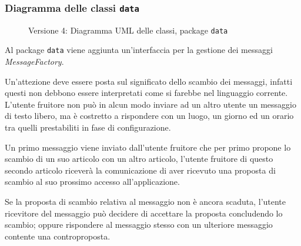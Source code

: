 \subsubsection{Diagramma delle classi \texttt{data}}
\vspace{0.5cm}
\begin{figure}[H]
    \centering
    \caption{Versione 4: Diagramma UML delle classi, package \texttt{data}}
    \label{fig:class_data_v_4}
\end{figure}

Al package \texttt{data} viene aggiunta un'interfaccia per la gestione dei messaggi \textit{MessageFactory}.

Un'attezione deve essere posta sul significato dello scambio dei messaggi, infatti questi non debbono essere interpretati come si farebbe
nel linguaggio corrente. L'utente fruitore non può in alcun modo inviare ad un altro utente un messaggio di testo libero, ma è costretto
a rispondere con un luogo, un giorno ed un orario tra quelli prestabiliti in fase di configurazione.

Un primo messaggio viene inviato dall'utente fruitore che per primo propone lo scambio di un suo articolo con un altro articolo,
l'utente fruitore di questo secondo articolo riceverà la comunicazione di aver ricevuto una proposta di scambio al suo prossimo accesso all'applicazione.

Se la proposta di scambio relativa al messaggio non è ancora scaduta, l'utente ricevitore del messaggio può decidere di accettare la proposta concludendo lo scambio;
oppure rispondere al messaggio stesso con un ulteriore messaggio contente una controproposta.